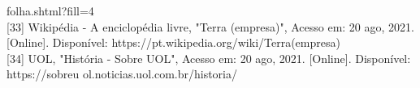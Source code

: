 \documentclass[a4paper]{article}
\begin{document}
\begin{titlepage}
folha.shtml?fill=4\\[0.5cm] [33] Wikipédia - A enciclopédia livre, "Terra (empresa)", Acesso em: 20 ago, 2021. [Online]. Disponível: https://pt.wikipedia.org/wiki/Terra\textunderscore (empresa)\\[0.5cm] [34] UOL, "História - Sobre UOL", Acesso em: 20 ago, 2021. [Online]. Disponível: https://sobreu ol.noticias.uol.com.br/historia/
\end{titlepage}
\end{document}
